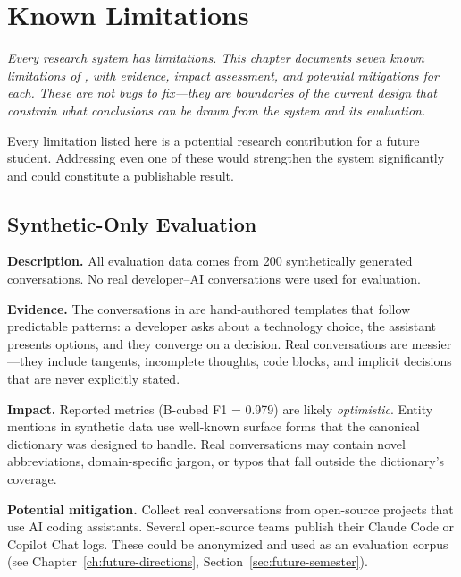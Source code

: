 \chapter{Known Limitations}
\label{ch:known-limitations}

\textit{Every research system has limitations.  This chapter documents
seven known limitations of \sysname{}, with evidence, impact assessment,
and potential mitigations for each.  These are not bugs to fix---they are
boundaries of the current design that constrain what conclusions can be
drawn from the system and its evaluation.}

\begin{keyinsight}
Every limitation listed here is a potential research contribution for a
future student.  Addressing even one of these would strengthen the system
significantly and could constitute a publishable result.
\end{keyinsight}


\section{Synthetic-Only Evaluation}
\label{sec:lim-synthetic}

\noindent\textbf{Description.}
All evaluation data comes from 200 synthetically generated conversations.
No real developer--AI conversations were used for evaluation.

\medskip\noindent\textbf{Evidence.}
The conversations in  are
hand-authored templates that follow predictable patterns: a developer asks
about a technology choice, the assistant presents options, and they
converge on a decision.  Real conversations are messier---they include
tangents, incomplete thoughts, code blocks, and implicit decisions that
are never explicitly stated.

\medskip\noindent\textbf{Impact.}
Reported metrics (B-cubed F1 = 0.979) are likely \emph{optimistic}.
Entity mentions in synthetic data use well-known surface forms that the
canonical dictionary was designed to handle.  Real conversations may
contain novel abbreviations, domain-specific jargon, or typos that fall
outside the dictionary's coverage.

\medskip\noindent\textbf{Potential mitigation.}
Collect real conversations from open-source projects that use AI coding
assistants.  Several open-source teams publish their Claude Code or
Copilot Chat logs.  These could be anonymized and used as an evaluation
corpus (see Chapter~\ref{ch:future-directions},
Section~\ref{sec:future-semester}).


